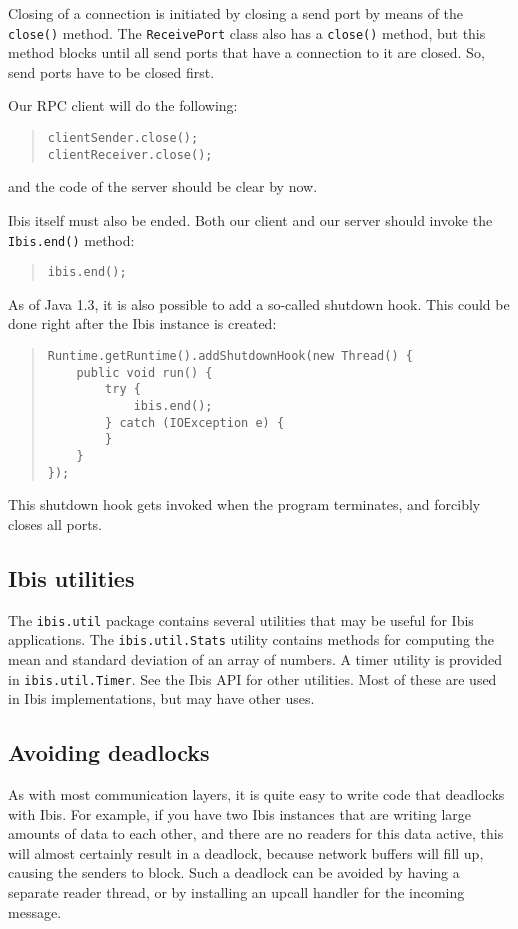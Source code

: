 \documentclass[10pt]{article}
\newcommand{\mysubsection}[1]{\subsection{#1}\label{#1}}
\begin{document}
Closing of a connection is initiated by closing a send port
by means of the \texttt{close()} method. The \texttt{ReceivePort}
class also has a \texttt{close()} method, but this method blocks
until all send ports that have a connection to it are closed.
So, send ports have to be closed first.

Our RPC client will do the following:

{\small
\begin{quote}
\begin{verbatim}
clientSender.close();
clientReceiver.close();
\end{verbatim}
\end{quote}
}
and the code of the server should be clear by now.

Ibis itself must also be ended. Both our client and our server
should invoke the \texttt{Ibis.end()} method:
{\small
\begin{quote}
\begin{verbatim}
ibis.end();
\end{verbatim}
\end{quote}
}

As of Java 1.3, it is also possible to add a so-called shutdown hook.
This could be done right after the Ibis instance is created:
{\small
\begin{quote}
\begin{verbatim}
Runtime.getRuntime().addShutdownHook(new Thread() {
    public void run() {
        try {
            ibis.end();
        } catch (IOException e) {
        }
    }
});
\end{verbatim}
\end{quote}
}
\noindent
This shutdown hook gets invoked when the program terminates, and
forcibly closes all ports.

\mysubsection{Ibis utilities}

The \texttt{ibis.util} package contains several utilities that may be
useful for Ibis applications.
The \texttt{ibis.util.Stats} utility contains methods for computing
the mean and standard deviation of an array of numbers.
A timer utility is provided in \texttt{ibis.util.Timer}.
See the Ibis API for other utilities. Most of these are used in
Ibis implementations, but may have other uses.

\mysubsection{Avoiding deadlocks}

As with most communication layers, it is quite easy to write code that
deadlocks with Ibis. For example, if you have two Ibis instances that
are writing large amounts of data to each other, and there are no
readers for this data active, this will almost certainly result in a deadlock,
because network buffers will fill up, causing the senders to block.
Such a deadlock can be avoided by having a separate reader thread,
or by installing an upcall handler for the incoming message.
\end{document}

